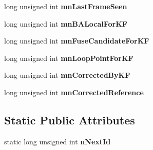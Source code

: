 \begin{DoxyCompactItemize}
\item 
long unsigned int {\bfseries mn\+Last\+Frame\+Seen}\hypertarget{classMultiColSLAM_1_1cMapPoint_a0fc82afa28d1bbf9e9feaef66fb6fea7}{}\label{classMultiColSLAM_1_1cMapPoint_a0fc82afa28d1bbf9e9feaef66fb6fea7}

\item 
long unsigned int {\bfseries mn\+B\+A\+Local\+For\+KF}\hypertarget{classMultiColSLAM_1_1cMapPoint_a5ce1a4fd7d1f5b95170f690347c24a80}{}\label{classMultiColSLAM_1_1cMapPoint_a5ce1a4fd7d1f5b95170f690347c24a80}

\item 
long unsigned int {\bfseries mn\+Fuse\+Candidate\+For\+KF}\hypertarget{classMultiColSLAM_1_1cMapPoint_a49801293d50bdccdc6cdb1b9ce18c658}{}\label{classMultiColSLAM_1_1cMapPoint_a49801293d50bdccdc6cdb1b9ce18c658}

\item 
long unsigned int {\bfseries mn\+Loop\+Point\+For\+KF}\hypertarget{classMultiColSLAM_1_1cMapPoint_ae6af450367608b3240bcf10891541e22}{}\label{classMultiColSLAM_1_1cMapPoint_ae6af450367608b3240bcf10891541e22}

\item 
long unsigned int {\bfseries mn\+Corrected\+By\+KF}\hypertarget{classMultiColSLAM_1_1cMapPoint_adc53d87ca7ed29123cf1de3c0331ae69}{}\label{classMultiColSLAM_1_1cMapPoint_adc53d87ca7ed29123cf1de3c0331ae69}

\item 
long unsigned int {\bfseries mn\+Corrected\+Reference}\hypertarget{classMultiColSLAM_1_1cMapPoint_a860db83a8e61450960df54ddbcd6b950}{}\label{classMultiColSLAM_1_1cMapPoint_a860db83a8e61450960df54ddbcd6b950}

\end{DoxyCompactItemize}
\subsection*{Static Public Attributes}
\begin{DoxyCompactItemize}
\item 
static long unsigned int {\bfseries n\+Next\+Id}\hypertarget{classMultiColSLAM_1_1cMapPoint_a6768e191b600bc8d57aa7d9048073488}{}\label{classMultiColSLAM_1_1cMapPoint_a6768e191b600bc8d57aa7d9048073488}

\end{DoxyCompactItemize}
